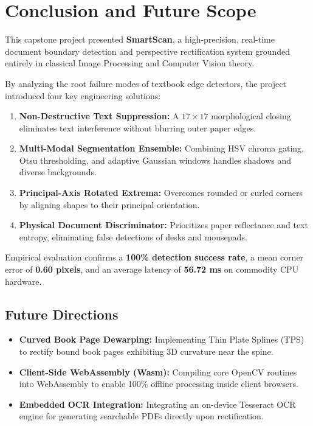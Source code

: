 \documentclass[11pt,a4paper]{article}
\begin{document}
\newpage
\section{Conclusion and Future Scope}
\label{sec:conclusion}

This capstone project presented \textbf{SmartScan}, a high-precision, real-time document boundary detection and perspective rectification system grounded entirely in classical Image Processing and Computer Vision theory. 

By analyzing the root failure modes of textbook edge detectors, the project introduced four key engineering solutions:
\begin{enumerate}[leftmargin=1.8em,itemsep=0.15em]
    \item \textbf{Non-Destructive Text Suppression:} A $17 \times 17$ morphological closing eliminates text interference without blurring outer paper edges.
    \item \textbf{Multi-Modal Segmentation Ensemble:} Combining HSV chroma gating, Otsu thresholding, and adaptive Gaussian windows handles shadows and diverse backgrounds.
    \item \textbf{Principal-Axis Rotated Extrema:} Overcomes rounded or curled corners by aligning shapes to their principal orientation.
    \item \textbf{Physical Document Discriminator:} Prioritizes paper reflectance and text entropy, eliminating false detections of desks and mousepads.
\end{enumerate}
Empirical evaluation confirms a \textbf{100\% detection success rate}, a mean corner error of \textbf{0.60 pixels}, and an average latency of \textbf{56.72 ms} on commodity CPU hardware.

\subsection{Future Directions}
\begin{itemize}[leftmargin=1.5em,itemsep=0.15em]
    \item \textbf{Curved Book Page Dewarping:} Implementing Thin Plate Splines (TPS) to rectify bound book pages exhibiting 3D curvature near the spine.
    \item \textbf{Client-Side WebAssembly (Wasm):} Compiling core OpenCV routines into WebAssembly to enable 100\% offline processing inside client browsers.
    \item \textbf{Embedded OCR Integration:} Integrating an on-device Tesseract OCR engine for generating searchable PDFs directly upon rectification.
\end{itemize}
\end{document}
